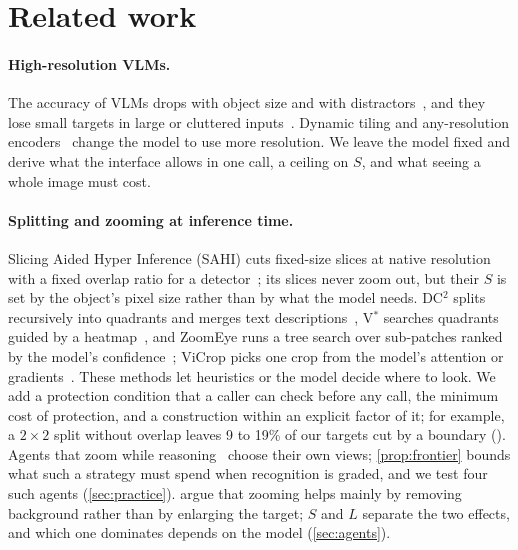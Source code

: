 \section{Related work}
\label{sec:related}

\paragraph{High-resolution VLMs.} The accuracy of VLMs drops with object size and with distractors~\cite{zhang2026perceptual,zhang2025mllmsknow}, and they lose small targets in large or cluttered inputs~\cite{wu2025visualhaystacks,sharma2024losing,zhang2025hrscene,zhang2025mmerealworld}. Dynamic tiling and any-resolution encoders~\cite{chen2024internvl15,xu2024llavauhd,bai2025qwen25vl} change the model to use more resolution. We leave the model fixed and derive what the interface allows in one call, a ceiling on $S$, and what seeing a whole image must cost.

\paragraph{Splitting and zooming at inference time.} Slicing Aided Hyper Inference (SAHI) cuts fixed-size slices at native resolution with a fixed overlap ratio for a detector~\cite{akyon2022sahi}; its slices never zoom out, but their $S$ is set by the object's pixel size rather than by what the model needs. DC$^2$ splits recursively into quadrants and merges text descriptions~\cite{wang2025dc2}, V$^\ast$ searches quadrants guided by a heatmap~\cite{wu2024vstar}, and ZoomEye runs a tree search over sub-patches ranked by the model's confidence~\cite{shen2024zoomeye}; ViCrop picks one crop from the model's attention or gradients~\cite{zhang2025mllmsknow}. These methods let heuristics or the model decide where to look. We add a protection condition that a caller can check before any call, the minimum cost of protection, and a construction within an explicit factor of it; for example, a $2 \times 2$ split without overlap leaves 9 to 19\% of our targets cut by a boundary (). Agents that zoom while reasoning~\cite{openai2025thinking,zheng2026deepeyes,lai2026minio3,zhang2025chainoffocus,su2025thinkingwithimages} choose their own views; \cref{prop:frontier} bounds what such a strategy must spend when recognition is graded, and we test four such agents (\cref{sec:practice}). \citet{liu2026hide} argue that zooming helps mainly by removing background rather than by enlarging the target; $S$ and $L$ separate the two effects, and which one dominates depends on the model (\cref{sec:agents}).

